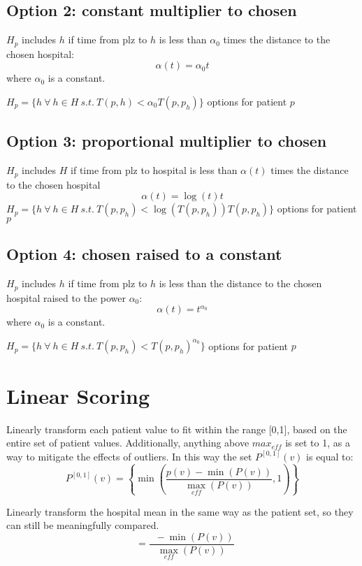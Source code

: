 \documentclass{amsart}
\newcommand*\mean[1]{\mathop{\overline{#1}}}
\begin{document}
\subsection{Option 2: constant multiplier to chosen}
$H_p$ includes $h$ if time from plz to $h$ is less than $\alpha_0$ times the distance to the chosen hospital:\\
$$\alpha(t) = \alpha_0t$$
where $\alpha_0$ is a constant.

$H_p = \{h \ \forall \ h \in H \ s.t. \ T(p, h) < \alpha_0 T(p, p_h) \}$ options for patient $p$\\



\subsection{Option 3: proportional multiplier to chosen}
$H_p$ includes $H$ if time from plz to hospital is less than $\alpha(t)$ times the distance to the chosen hospital\\
$$\alpha(t) = \log(t)t $$
$H_p = \{h \ \forall \ h \in H \ s.t. \ T(p, p_h) < \log(T(p,p_h))T(p, p_h) \}$ options for patient $p$\\


\subsection{Option 4: chosen raised to a constant}
$H_p$ includes $h$ if time from plz to $h$ is less than the distance to the chosen hospital raised to the power $\alpha_0$:
$$\alpha(t) = t^{\alpha_0}$$
where $\alpha_0$ is a constant.

$H_p = \{h \ \forall \ h \in H \ s.t. \ T(p, p_h) < T(p, p_h)^{\alpha_0} \}$ options for patient $p$\\

\section{Linear Scoring}

Linearly transform each patient value to fit within the range [0,1], based on the entire set of patient values. Additionally, anything above $max_{eff}$ is set to 1, as a way to mitigate the effects of outliers. In this way the set $P^{\left[0,1\right]}(v)$ is equal to:
$$P^{\left[0,1\right]}(v) = \left\{ \min(\frac{p(v) - \min(P(v))}{\max_{eff}(P(v))}, 1) \right\}$$

Linearly transform the hospital mean in the same way as the patient set, so they can still be meaningfully compared.
$$\mean{H^{\left[0,1\right]}_p(v)} = \frac{\mean{H_p(v)} - \min(P(v))}{\max_{eff}(P(v))}$$
\end{document}
